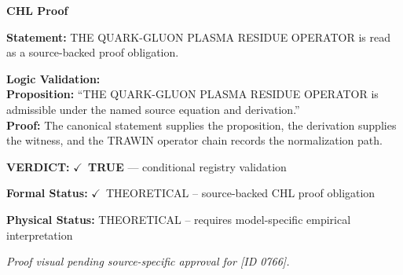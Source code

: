 \vspace{0.45em}
\noindent\textbf{CHL Proof}\par
\textbf{Statement:} THE QUARK-GLUON PLASMA RESIDUE OPERATOR is read as a source-backed proof obligation.

\textbf{Logic Validation:}\\
\textbf{Proposition:} ``THE QUARK-GLUON PLASMA RESIDUE OPERATOR is admissible under the named source equation and derivation.''\\
\textbf{Proof:} The canonical statement supplies the proposition, the derivation supplies the witness, and the TRAWIN operator chain records the normalization path.

\textbf{VERDICT:} \ensuremath{\checkmark}\ \textbf{TRUE} --- conditional registry validation

\textbf{Formal Status:} \ensuremath{\checkmark}\ THEORETICAL -- source-backed CHL proof obligation

\textbf{Physical Status:} THEORETICAL -- requires model-specific empirical interpretation
\par\vspace{0.45em}
\par
\vfill
\begingroup\footnotesize\itshape
Proof visual pending source-specific approval for [ID 0766].
\par\endgroup
\vfill
\endgroup
\endgroup
